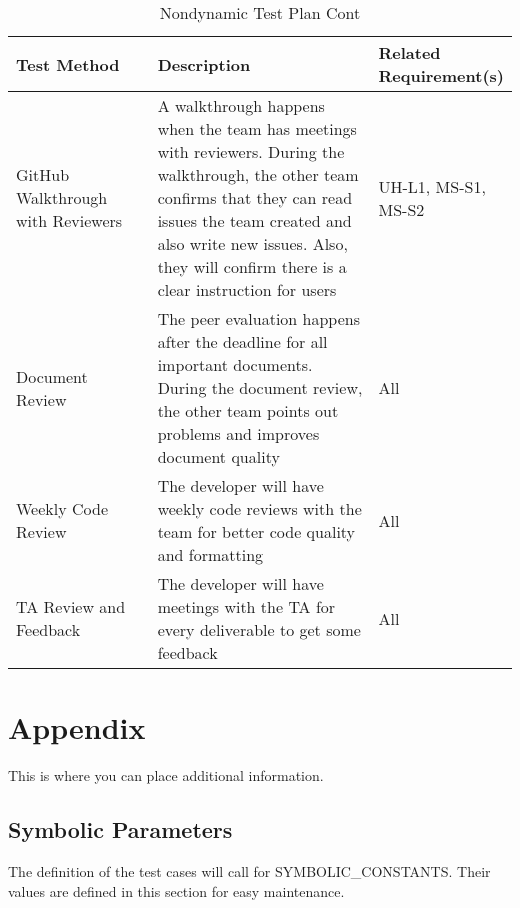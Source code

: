 \documentclass[12pt, titlepage]{article}
\begin{document}
\begin{table}[H]
\caption{Nondynamic Test Plan Cont}
\begin{tabular}{|p{0.3\linewidth} | p{0.5\linewidth}| p{0.2\linewidth} |}
\hline
\multicolumn{1}{|l}{\bfseries Test Method} & \multicolumn{1}{|l|}{\bfseries Description} & \multicolumn{1}{l|}{\bfseries Related Requirement(s)}\\
\hline
GitHub Walkthrough with Reviewers & A walkthrough happens when the team has meetings with reviewers. During the walkthrough, the other team confirms that they can read issues the team created and also write new issues. Also, they will confirm there is a clear instruction for users & UH-L1, MS-S1, MS-S2\\
\hline
Document Review & The peer evaluation happens after the deadline for all important documents. During the document review, the other team points out problems and improves document quality & All\\
\hline
Weekly Code Review & The developer will have weekly code reviews with the team for better code quality and formatting & All\\
\hline
TA Review and Feedback & The developer will have meetings with the TA for every deliverable to get some feedback & All\\
\hline
\end{tabular}
\end{table}

\newpage

\section{Appendix}

This is where you can place additional information.

\subsection{Symbolic Parameters}

The definition of the test cases will call for SYMBOLIC\_CONSTANTS.
Their values are defined in this section for easy maintenance.
\end{document}
